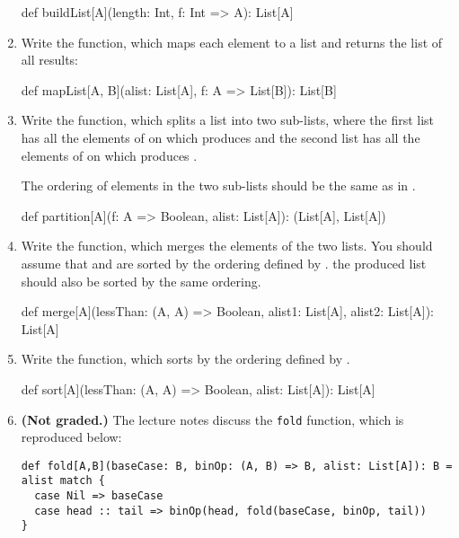 \documentclass[9pt]{extbook}
\begin{document}
\begin{enumerate}
\begin{scalacode}
def buildList[A](length: Int, f: Int => A): List[A]
\end{scalacode}

\item
Write the  function, which maps each element to a list and returns
the list of all results:

\begin{scalacode}
def mapList[A, B](alist: List[A], f: A => List[B]): List[B]
\end{scalacode}

\item
Write the  function, which splits a list into
two sub-lists, where the first list has all the elements of 
on which  produces  and the second
list has all the elements of  on which 
produces .

The ordering of elements in the two sub-lists should be the same
as in .

\begin{scalacode}
def partition[A](f: A => Boolean, alist: List[A]): (List[A], List[A])
\end{scalacode}

\item
Write the  function, which merges
the elements of the two lists. You should assume that 
and  are sorted by the ordering defined by .
the produced list should also be sorted by the same ordering.

\begin{scalacode}
def merge[A](lessThan: (A, A) => Boolean, alist1: List[A], alist2: List[A]): List[A]
\end{scalacode}

\item
Write the  function, which sorts  by the ordering
defined by .

\begin{scalacode}
def sort[A](lessThan: (A, A) => Boolean, alist: List[A]): List[A]
\end{scalacode}


\item \textbf{(Not graded.)}  The lecture notes discuss the
\lstinline|fold| function, which is reproduced below:
\begin{lstlisting}
def fold[A,B](baseCase: B, binOp: (A, B) => B, alist: List[A]): B = alist match {
  case Nil => baseCase
  case head :: tail => binOp(head, fold(baseCase, binOp, tail))
}
\end{lstlisting}


\end{enumerate}
\end{document}
